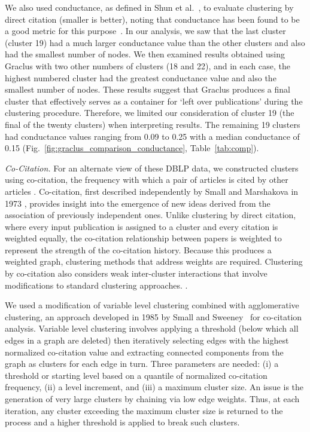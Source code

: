 We also used conductance, as defined in Shun et al.~\cite{shun_parallel_2016}, to  evaluate clustering by direct citation (smaller is better), noting that conductance has been found to be a good metric for this purpose~\cite{emmons2016analysis,almeida_2012}. In our analysis, we saw that the last cluster (cluster 19) had a much larger conductance value than the other clusters and also had the smallest number of nodes. We then examined results obtained using Graclus with two other numbers of clusters (18 and 22), and in each case, the highest numbered cluster had the greatest conductance value and also the smallest number of nodes. These results suggest that Graclus produces a final cluster that effectively serves as a container for `left over publications' during the clustering procedure. Therefore, we limited our consideration of cluster 19 (the final of the twenty clusters)  when interpreting results.  The remaining 19 clusters had conductance values ranging from 0.09 to 0.25 with a median conductance of 0.15 (Fig.~\ref{fig:graclus_comparison_conductance}, Table~\ref{tab:comp}).

\emph{Co-Citation.} For an alternate view of these DBLP data, we constructed clusters using co-citation, the frequency with which a pair of articles is cited by other articles \cite{small_co-citation_1973,marshakova-shaikevich_co-citation_1973}. Co-citation, first described independently by Small and Marshakova in 1973 \cite{marshakova-shaikevich_co-citation_1973}, provides insight into the emergence of new ideas derived from the association of previously independent ones. Unlike clustering by direct citation, where every input publication is assigned to a cluster and every citation is weighted equally, the co-citation relationship between papers is weighted to represent the strength of the co-citation history. Because this produces a weighted graph, clustering methods that address weights are required. Clustering by co-citation also considers weak inter-cluster interactions that involve modifications to standard clustering approaches. \cite{boyack_cocitation_2010,boyack_improving_2013,small_structure_1974,small_clustering_1985}. 

We used a modification of variable level clustering combined with agglomerative clustering, an approach developed in 1985 by Small and Sweeney~\cite{small_clustering_1985} for co-citation analysis.
Variable level clustering involves applying a threshold (below which all edges in a graph are deleted) then iteratively selecting edges with the highest normalized co-citation value and extracting connected components from the graph as clusters for each edge in turn. Three parameters are needed: (i) a threshold or starting level based on a quantile of normalized co-citation frequency, (ii) a level increment, and (iii) a maximum cluster size. An issue is the generation of very large clusters by chaining via low edge weights.  Thus, at each iteration, any cluster exceeding the maximum cluster size  is returned to the process and a higher threshold is applied to break such clusters.


